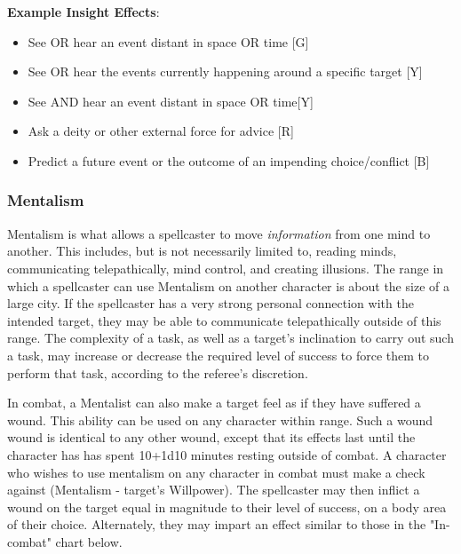 \documentclass[oneside]{book}
\begin{document}
\begin{multicols}{2}
\textbf{Example Insight Effects}:
	\begin{itemize}
		\setlength{\itemsep}{0cm}%
  		\setlength{\parskip}{0cm}%
		\item{ \small See OR hear an event distant in space OR time [G]}
		\item{ \small See OR hear the events currently happening around a specific target [Y]}
		\item{ \small See AND hear an event distant in space OR time[Y]}
		\item{ \small Ask a deity or other external force for advice [R]}
		\item{ \small Predict a future event or the outcome of an impending choice/conflict [B]}
	\end{itemize}

\subsubsection{Mentalism}
Mentalism is what allows a spellcaster to move \emph{information} from one mind to another. This includes, but is not necessarily limited to, reading minds, communicating telepathically, mind control, and creating illusions. The range in which a spellcaster can use Mentalism on another character is about the size of a large city. If the spellcaster has a very strong personal connection with the intended target, they may be able to communicate telepathically outside of this range. The complexity of a task, as well as a target's inclination to carry out such a task, may increase or decrease the required level of success to force them to perform that task, according to the referee's discretion.

In combat, a Mentalist can also make a target feel as if they have suffered a wound. This ability can be used on any character within range. Such a wound wound is identical to any other wound, except that its effects last until the character has has spent 10+1d10 minutes resting outside of combat. A character who wishes to use mentalism on any character in combat must make a check against (Mentalism - target's Willpower). The spellcaster may then inflict a wound on the target equal in magnitude to their level of success, on a body area of their choice. Alternately, they may impart an effect similar to those in the "In-combat" chart below.  


\end{multicols}
\end{document}
